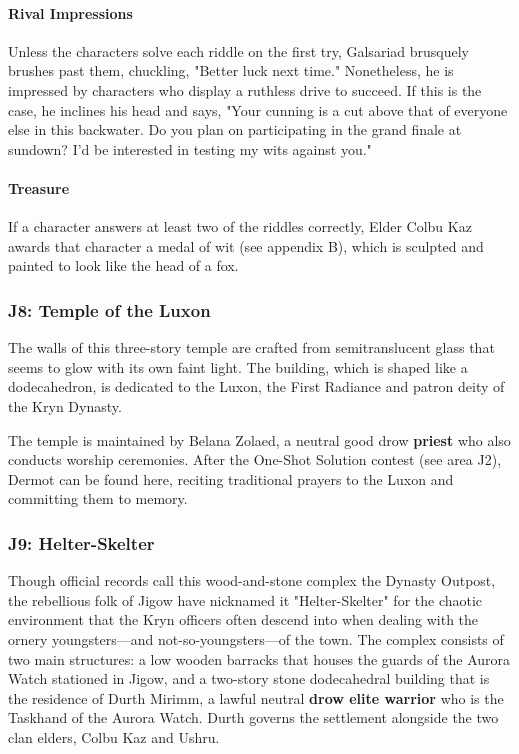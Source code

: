 \documentclass[10pt,a4,twoside,twocolumn,openany,nodeprecatedcode]{dndbook}
\begin{document}
\paragraph{Rival Impressions}
Unless the characters solve each riddle on the first try, Galsariad brusquely brushes past them, chuckling, "Better luck next time." Nonetheless, he is impressed by characters who display a ruthless drive to succeed. If this is the case, he inclines his head and says, "Your cunning is a cut above that of everyone else in this backwater. Do you plan on participating in the grand finale at sundown? I'd be interested in testing my wits against you."
\paragraph{Treasure}
If a character answers at least two of the riddles correctly, Elder Colbu Kaz awards that character a medal of wit (see appendix B), which is sculpted and painted to look like the head of a fox.
\subsubsection{J8: Temple of the Luxon}
\begin{DndReadAloud}{}
The walls of this three-story temple are crafted from semitranslucent glass that seems to glow with its own faint light. The building, which is shaped like a dodecahedron, is dedicated to the Luxon, the First Radiance and patron deity of the Kryn Dynasty.
\end{DndReadAloud}

The temple is maintained by Belana Zolaed, a neutral good drow \textbf{priest} who also conducts worship ceremonies.
After the One-Shot Solution contest (see area J2), Dermot can be found here, reciting traditional prayers to the Luxon and committing them to memory.
\subsubsection{J9: Helter-Skelter}
Though official records call this wood-and-stone complex the Dynasty Outpost, the rebellious folk of Jigow have nicknamed it "Helter-Skelter" for the chaotic environment that the Kryn officers often descend into when dealing with the ornery youngsters—and not-so-youngsters—of the town.
The complex consists of two main structures: a low wooden barracks that houses the guards of the Aurora Watch stationed in Jigow, and a two-story stone dodecahedral building that is the residence of Durth Mirimm, a lawful neutral \textbf{drow elite warrior} who is the Taskhand of the Aurora Watch. Durth governs the settlement alongside the two clan elders, Colbu Kaz and Ushru.
\end{document}
